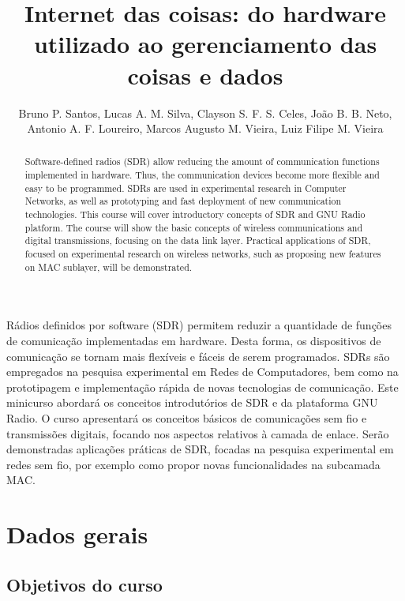 \documentclass{SBCbookchapter}
\title{Internet das coisas: do hardware utilizado ao gerenciamento das coisas e dados}
\author{Bruno P. Santos, Lucas A. M. Silva, Clayson S. F. S. Celes, João B. B. Neto, Antonio A. F. Loureiro, Marcos Augusto M. Vieira, Luiz Filipe M. Vieira}
\begin{document}
\maketitle

\begin{abstract}
Software-defined radios (SDR) allow reducing the amount of
communication functions implemented in hardware. Thus, the
communication devices become more flexible and easy to be
programmed. SDRs are used in experimental research in Computer
Networks, as well as prototyping and fast deployment of new
communication technologies. This course will cover introductory
concepts of SDR and GNU Radio platform. The course will show the
basic concepts of wireless communications and digital transmissions,
focusing on the data link layer. Practical applications of SDR,
focused on experimental research on wireless networks, such as
proposing new features on MAC sublayer, will be demonstrated.
\end{abstract}

\begin{resumo}
\begin{otherlanguage}{brazilian}
Rádios definidos por software (SDR) permitem reduzir a quantidade de funções de comunicação implementadas em hardware. Desta forma, os dispositivos de comunicação se tornam mais flexíveis e fáceis de serem programados. SDRs são empregados na pesquisa experimental em Redes de Computadores, bem como na prototipagem e implementação rápida de novas tecnologias de comunicação. Este minicurso abordará os conceitos introdutórios de SDR e da plataforma GNU Radio.  O curso apresentará os conceitos básicos de comunicações sem fio e transmissões digitais, focando nos aspectos relativos à camada de enlace. Serão demonstradas aplicações práticas de SDR, focadas na pesquisa experimental em redes sem fio, por exemplo como propor novas funcionalidades na subcamada MAC.

\end{otherlanguage}
\end{resumo}

\section{Dados gerais}
\subsection{Objetivos do curso}
\end{document}
